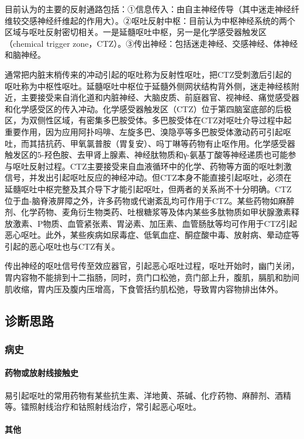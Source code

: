目前认为的主要的反射通路包括：①信息传入：由自主神经传导（其中迷走神经纤维较交感神经纤维起的作用大）。②呕吐反射中枢：目前认为中枢神经系统的两个区域与呕吐反射密切相关。一是延髓呕吐中枢，另一是化学感受器触发区（chemical
trigger zone，CTZ）。③传出神经：包括迷走神经、交感神经、体神经和脑神经。

通常把内脏末梢传来的冲动引起的呕吐称为反射性呕吐，把CTZ受刺激后引起的呕吐称为中枢性呕吐。延髓呕吐中枢位于延髓外侧网状结构背外侧，迷走神经核附近，主要接受来自消化道和内脏神经、大脑皮质、前庭器官、视神经、痛觉感受器和化学感受区的传入冲动。化学感受器触发区（CTZ）位于第四脑室底部的后极区，为双侧性区域，有密集多巴胺受体。多巴胺受体在CTZ对呕吐介导过程中起重要作用，因为应用阿扑吗啡、左旋多巴、溴隐亭等多巴胺受体激动药可引起呕吐，而其拮抗药、甲氧氯普胺（胃复安）、吗丁啉等药物有止呕作用。化学感受器触发区的5-羟色胺、去甲肾上腺素、神经肽物质和γ-氨基丁酸等神经递质也可能参与呕吐反射过程。CTZ主要接受来自血液循环中的化学、药物等方面的呕吐刺激信号，并发出引起呕吐反应的神经冲动。但CTZ本身不能直接引起呕吐，必须在延髓呕吐中枢完整及其介导下才能引起呕吐，但两者的关系尚不十分明确。CTZ位于血-脑脊液屏障之外，许多药物或代谢紊乱均可作用于CTZ。某些药物如麻醉剂、化学药物、麦角衍生物类药、吐根糖浆等及体内某些多肽物质如甲状腺激素释放激素、P物质、血管紧张素、胃泌素、加压素、血管肠肽等均可作用于CTZ引起恶心呕吐。此外，某些疾病如尿毒症、低氧血症、酮症酸中毒、放射病、晕动症等引起的恶心呕吐也与CTZ有关。

传出神经的呕吐信号传至效应器官，引起恶心呕吐过程，呕吐开始时，幽门关闭，胃内容物不能排到十二指肠，同时，贲门口松弛，贲门部上升，腹肌，膈肌和肋间肌收缩，胃内压及腹内压增高，下食管括约肌松弛，导致胃内容物排出体外。

\subsection{诊断思路}

\subsubsection{病史}

\paragraph{药物或放射线接触史}

易引起呕吐的常用药物有某些抗生素、洋地黄、茶碱、化疗药物、麻醉剂、酒精等。镭照射线治疗和钴照射线治疗，常引起恶心呕吐。

\paragraph{其他}

